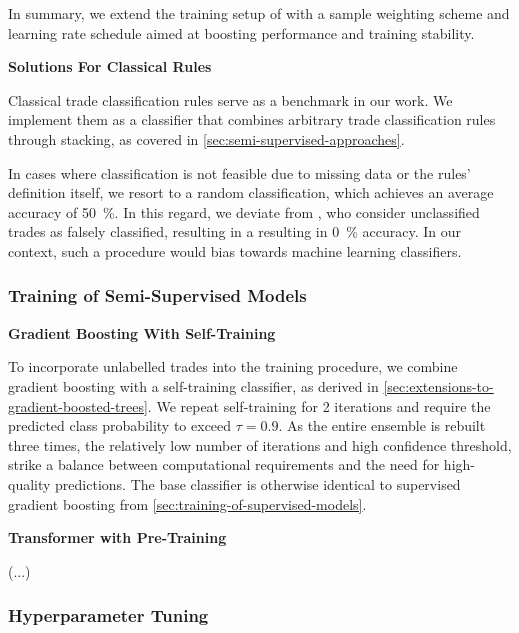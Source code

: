 In summary, we extend the training setup of \textcite[][6]{gorishniyRevisitingDeepLearning2021} with a sample weighting scheme and learning rate schedule aimed at boosting performance and training stability.

\textbf{Solutions For Classical Rules}

Classical trade classification rules serve as a benchmark in our work. We implement them as a classifier that combines arbitrary trade classification rules through stacking, as covered in \cref{sec:semi-supervised-approaches}.

In cases where classification is not feasible due to missing data or the rules' definition itself, we resort to a random classification, which achieves an average accuracy of \SI{50}{\percent}. In this regard, we deviate from \textcite[][29--32]{grauerOptionTradeClassification2022}, who consider unclassified trades as falsely classified, resulting in a resulting in \SI{0}{\percent} accuracy. In our context, such a procedure would bias towards machine learning classifiers.

\subsubsection{Training of Semi-Supervised
    Models}\label{sec:training-of-semi-supervised-models}

\textbf{Gradient Boosting With Self-Training}

To incorporate unlabelled trades into the training procedure, we combine gradient boosting with a self-training classifier, as derived in \cref{sec:extensions-to-gradient-boosted-trees}. We repeat self-training for 2 iterations and require the predicted class probability to exceed $\tau=0.9$. As the entire ensemble is rebuilt three times, the relatively low number of iterations and high confidence threshold, strike a balance between computational requirements and the need for high-quality predictions. The base classifier is otherwise identical to supervised gradient boosting from \cref{sec:training-of-supervised-models}.

\textbf{Transformer with Pre-Training}

(...)

\subsubsection{Hyperparameter Tuning}\label{sec:hyperparameter-tuning}

